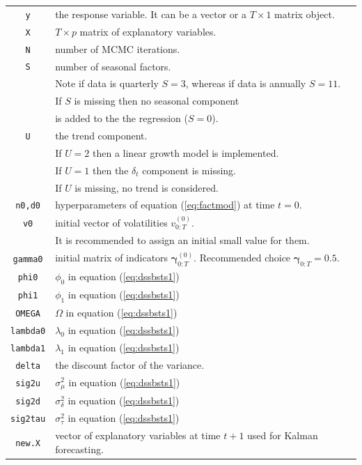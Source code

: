 \documentclass[
  12pt,
]{book}
\theoremstyle{break}
\theoremstyle{nonumberplain}
\begin{document}
\begin{small}
\begin{longtable}{ c l }
\texttt{y} &  the response variable. It can be a vector or a $T\times1$ matrix object. \\
\texttt{X} &  $T \times p$ matrix of explanatory variables.\\
\texttt{N} &  number of MCMC iterations. \\
\texttt{S} &  number of seasonal factors. \\
 & Note if data is quarterly $S=3$, whereas if data is annually $S=11$. \\
 & If $S$ is missing then no seasonal component\\
 & is added to the the regression ($S=0$). \\
\texttt{U} &  the trend component. \\
 & If $U=2$ then a linear growth model is implemented.\\
 & If $U=1$ then the $\delta_{t}$ component is missing. \\
 & If $U$ is missing, no trend is considered.\\
\texttt{n0,d0} & hyperparameters of equation (\ref{eq:factmod}) at time $t=0$.\\
\texttt{v0} &  initial vector of volatilities $v^{(0)}_{0:T}$. \\
 & It is recommended to assign an initial small value for them. \\
\texttt{gamma0} &  initial matrix of indicators $\boldsymbol{\gamma}^{(0)}_{0:T}$. Recommended choice $\boldsymbol{\gamma}_{0:T}=0.5$.  \\  
\texttt{phi0} & $\phi_{0}$ in equation (\ref{eq:dssbsts1})\\
\texttt{phi1} &  $\phi_1$ in equation (\ref{eq:dssbsts1})\\
\texttt{OMEGA} &  $\Omega$ in equation (\ref{eq:dssbsts1})\\
\texttt{lambda0} &  $\lambda_0$ in equation (\ref{eq:dssbsts1})\\
\texttt{lambda1} &  $\lambda_1$ in equation (\ref{eq:dssbsts1})\\
\texttt{delta} & the discount factor of the variance.\\
\texttt{sig2u} & $\sigma^{2}_{\mu}$ in equation (\ref{eq:dssbsts1})\\
\texttt{sig2d} & $\sigma^{2}_{\delta}$ in equation (\ref{eq:dssbsts1})\\
\texttt{sig2tau} & $\sigma^{2}_{\tau}$ in equation (\ref{eq:dssbsts1})\\
\texttt{new.X} &  vector of explanatory variables at time $t+1$ used for Kalman forecasting.
\end{longtable}
\end{small}
\end{document}
